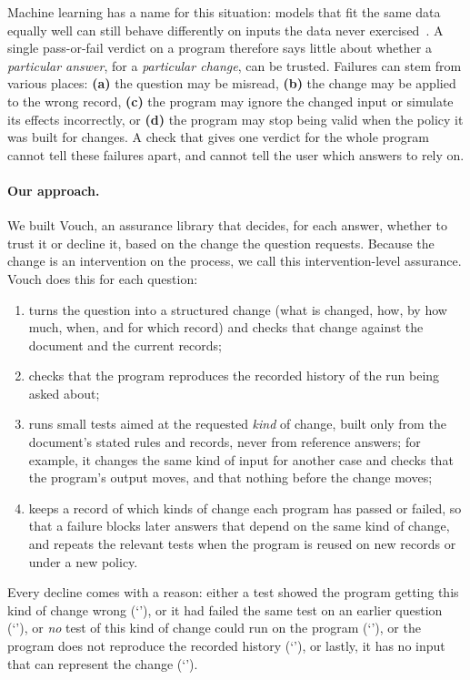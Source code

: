 Machine learning has a name for this situation: models that fit the same data equally well can still behave differently on inputs the data never exercised~\cite{damour2022underspecification}. A single pass-or-fail verdict on a program therefore says little about whether a \emph{particular answer}, for a \emph{particular change}, can be trusted. Failures can stem from various places: \textbf{(a)} the question may be misread, \textbf{(b)} the change may be applied to the wrong record, \textbf{(c)} the program may ignore the changed input or simulate its effects incorrectly, or \textbf{(d)} the program may stop being valid when the policy it was built for changes. A check that gives one verdict for the whole program cannot tell these failures apart, and cannot tell the user which answers to rely on. 

\paragraph{Our approach.} We built Vouch, an assurance library that decides, for each answer, whether to trust it or decline it, based on the change the question requests. Because the change is an intervention on the process, we call this intervention-level assurance. Vouch does this for each question:
\begin{enumerate}[leftmargin=*,nosep]
  \item turns the question into a structured change (what is changed, how, by how much, when, and for which record) and checks that change against the document and the current records;
  \item checks that the program reproduces the recorded history of the run being asked about;
  \item runs small tests aimed at the requested \emph{kind} of change, built only from the document's stated rules and records, never from reference answers; for example, it changes the same kind of input for another case and checks that the program's output moves, and that nothing before the change moves;
  \item keeps a record of which kinds of change each program has passed or failed, so that a failure blocks later answers that depend on the same kind of change, and repeats the relevant tests when the program is reused on new records or under a new policy.
\end{enumerate}
Every decline comes with a reason: either a test showed the program getting this kind of change wrong (`\textbf{\Caught}'), or it had failed the same test on an earlier question (`\textbf{\Already}'), or \emph{no} test of this kind of change could run on the program (`\textbf{\Untestable}'), or the program does not reproduce the recorded history (`\textbf{\Failhist}'), or lastly, it has no input that can represent the change (`\textbf{\Cantexpress}').

